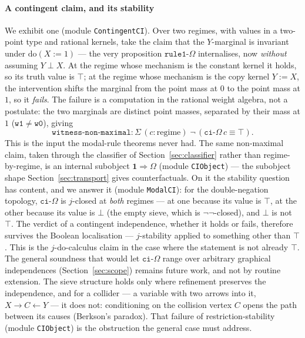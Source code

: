 \documentclass{lmcs}
\newcommand{\Om}{\Omega}
\newcommand{\dom}[2]{\mathrm{do}(#1\!:=\!#2)}
\newcommand{\nn}{\neg\neg}
\begin{document}
\paragraph{A contingent claim, and its stability}
We exhibit one (module \texttt{ContingentCI}).
Over two regimes, with values in a two-point type and rational kernels, take the claim that the $Y$-marginal is invariant under $\dom{X}{1}$ --- the very proposition $\mathtt{rule1\text{-}\Omega}$ internalises, now \emph{without} assuming $Y \perp X$.
At the regime whose mechanism is the constant kernel it holds, so its truth value is $\top$; at the regime whose mechanism is the copy kernel $Y := X$, the intervention shifts the marginal from the point mass at $0$ to the point mass at $1$, so it \emph{fails}.
The failure is a computation in the rational weight algebra, not a postulate: the two marginals are distinct point masses, separated by their mass at $1$ ($\mathtt{w1} \neq \mathtt{w0}$), giving
\[ \mathtt{witness\text{-}non\text{-}maximal} : \Sigma\,(c : \text{regime})\;\neg\,(\mathtt{ci\text{-}\Omega}\,c \equiv \top). \]
This is the input the modal-rule theorems never had.
The same non-maximal claim, taken through the classifier of Section~\ref{sec:classifier} rather than regime-by-regime, is an internal subobject $\mathbf{1} \Rightarrow \Om$ (module \texttt{CIObject}) --- the subobject shape Section~\ref{sec:transport} gives counterfactuals.
On it the stability question has content, and we answer it (module \texttt{ModalCI}): for the double-negation topology, $\mathtt{ci\text{-}\Omega}$ is $j$-closed at \emph{both} regimes --- at one because its value is $\top$, at the other because its value is $\bot$ (the empty sieve, which is $\nn$-closed), and $\bot$ is not $\top$.
The verdict of a contingent independence, whether it holds or fails, therefore survives the Boolean localisation --- $j$-stability applied to something other than $\top$.
This is the $j$-do-calculus claim in the case where the statement is not already $\top$. The general soundness that would let $\mathtt{ci\text{-}\Omega}$ range over arbitrary graphical independences (Section~\ref{sec:scope}) remains future work, and not by routine extension. The sieve structure holds only where refinement preserves the independence, and for a collider --- a variable with two arrows into it, $X \to C \leftarrow Y$ --- it does not: conditioning on the collision vertex $C$ opens the path between its causes (Berkson's paradox). That failure of restriction-stability (module \texttt{CIObject}) is the obstruction the general case must address.
\end{document}
